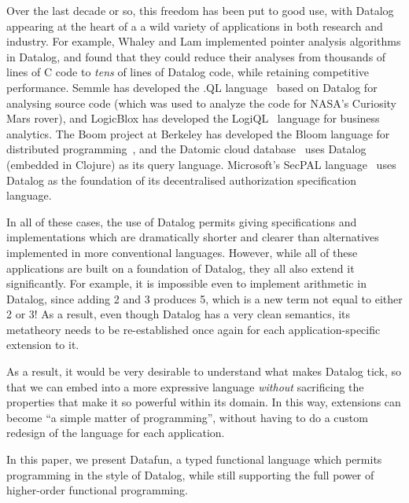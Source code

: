 Over the last decade or so, this freedom has been put to good use, with Datalog
appearing at the heart of a a wild variety of applications in both research and
industry. For example, Whaley and Lam \cite{whaley-lam,whaley-phd} implemented
pointer analysis algorithms in Datalog, and found that they could reduce their
analyses from thousands of lines of C code to \emph{tens} of lines of Datalog
code, while retaining competitive performance. Semmle has developed the .QL
language~\cite{semmlecode,ql-inference} based on Datalog for analysing source
code (which was used to analyze the code for NASA's Curiosity Mars rover), and
LogicBlox has developed the LogiQL~\cite{logicblox} language for business
analytics. The Boom project at Berkeley has developed the Bloom language for
distributed programming~\cite{bloom}, and the Datomic cloud
database~\cite{datomic} uses Datalog (embedded in Clojure) as its query
language. Microsoft's SecPAL language~\cite{secpal} uses Datalog as the
foundation of its decentralised authorization specification language.

In all of these cases, the use of Datalog permits giving specifications and
implementations which are dramatically shorter and clearer than alternatives
implemented in more conventional languages. However, while all of these
applications are built on a foundation of Datalog, they all also extend it
significantly. For example, it is impossible even to implement arithmetic in
Datalog, since adding 2 and 3 produces 5, which is a new term not equal to
either 2 or 3! As a result, even though Datalog has a very clean semantics, its
metatheory needs to be re-established once again for each application-specific
extension to it.

As a result, it would be very desirable to understand what makes Datalog tick,
so that we can embed into a more expressive language \emph{without} sacrificing
the properties that make it so powerful within its domain. In this way,
extensions can become ``a simple matter of programming'', without having to do a
custom redesign of the language for each application.

In this paper, we present Datafun, a typed functional language which permits
programming in the style of Datalog, while still supporting the full power of
higher-order functional programming.

